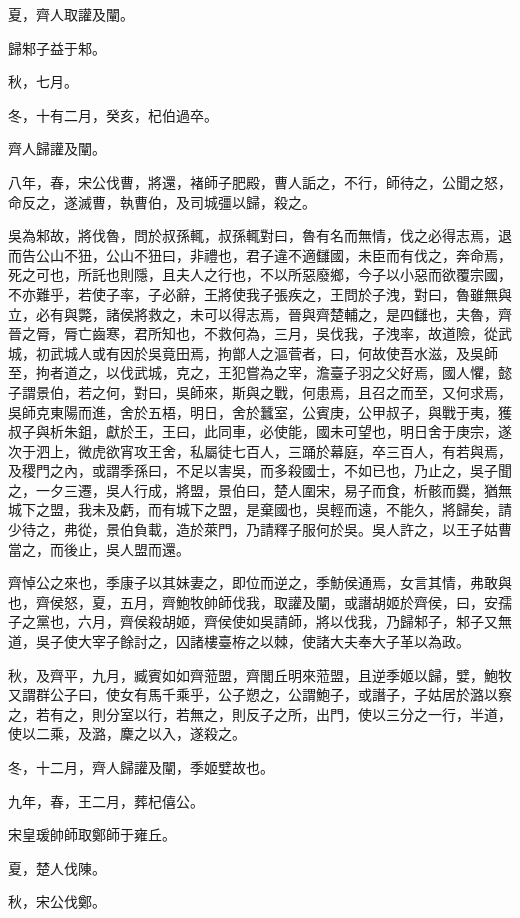 \begin{pinyinscope}
夏，齊人取讙及闡。

歸邾子益于邾。

秋，七月。

冬，十有二月，癸亥，杞伯過卒。

齊人歸讙及闡。

八年，春，宋公伐曹，將還，褚師子肥殿，曹人詬之，不行，師待之，公聞之怒，命反之，遂滅曹，執曹伯，及司城彊以歸，殺之。

吳為邾故，將伐魯，問於叔孫輒，叔孫輒對曰，魯有名而無情，伐之必得志焉，退而告公山不狃，公山不狃曰，非禮也，君子違不適讎國，未臣而有伐之，奔命焉，死之可也，所託也則隱，且夫人之行也，不以所惡廢鄉，今子以小惡而欲覆宗國，不亦難乎，若使子率，子必辭，王將使我子張疾之，王問於子洩，對曰，魯雖無與立，必有與斃，諸侯將救之，未可以得志焉，晉與齊楚輔之，是四讎也，夫魯，齊晉之脣，脣亡齒寒，君所知也，不救何為，三月，吳伐我，子洩率，故道險，從武城，初武城人或有因於吳竟田焉，拘鄫人之漚菅者，曰，何故使吾水滋，及吳師至，拘者道之，以伐武城，克之，王犯嘗為之宰，澹臺子羽之父好焉，國人懼，懿子謂景伯，若之何，對曰，吳師來，斯與之戰，何患焉，且召之而至，又何求焉，吳師克東陽而進，舍於五梧，明日，舍於蠶室，公賓庚，公甲叔子，與戰于夷，獲叔子與析朱鉏，獻於王，王曰，此同車，必使能，國未可望也，明日舍于庚宗，遂次于泗上，微虎欲宵攻王舍，私屬徒七百人，三踊於幕庭，卒三百人，有若與焉，及稷門之內，或謂季孫曰，不足以害吳，而多殺國士，不如已也，乃止之，吳子聞之，一夕三遷，吳人行成，將盟，景伯曰，楚人圍宋，易子而食，析骸而爨，猶無城下之盟，我未及虧，而有城下之盟，是棄國也，吳輕而遠，不能久，將歸矣，請少待之，弗從，景伯負載，造於萊門，乃請釋子服何於吳。吳人許之，以王子姑曹當之，而後止，吳人盟而還。

齊悼公之來也，季康子以其妹妻之，即位而逆之，季魴侯通焉，女言其情，弗敢與也，齊侯怒，夏，五月，齊鮑牧帥師伐我，取讙及闡，或譖胡姬於齊侯，曰，安孺子之黨也，六月，齊侯殺胡姬，齊侯使如吳請師，將以伐我，乃歸邾子，邾子又無道，吳子使大宰子餘討之，囚諸樓臺栫之以棘，使諸大夫奉大子革以為政。

秋，及齊平，九月，臧賓如如齊蒞盟，齊閭丘明來蒞盟，且逆季姬以歸，嬖，鮑牧又謂群公子曰，使女有馬千乘乎，公子愬之，公謂鮑子，或譖子，子姑居於潞以察之，若有之，則分室以行，若無之，則反子之所，出門，使以三分之一行，半道，使以二乘，及潞，麇之以入，遂殺之。

冬，十二月，齊人歸讙及闡，季姬嬖故也。

九年，春，王二月，葬杞僖公。

宋皇瑗帥師取鄭師于雍丘。

夏，楚人伐陳。

秋，宋公伐鄭。


\end{pinyinscope}
